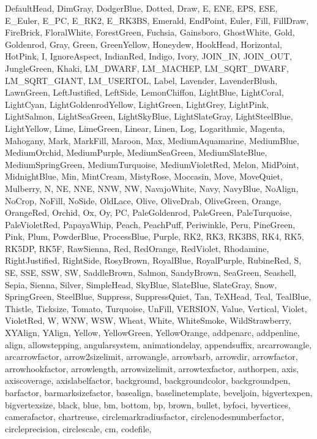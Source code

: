{{  DefaultHead, DimGray, DodgerBlue, Dotted, Draw, E, ENE, EPS, ESE, E_Euler,
  E_PC, E_RK2, E_RK3BS, Emerald, EndPoint, Euler, Fill, FillDraw, FireBrick,
  FloralWhite, ForestGreen, Fuchsia, Gainsboro, GhostWhite, Gold, Goldenrod,
  Gray, Green, GreenYellow, Honeydew, HookHead, Horizontal, HotPink, I,
  IgnoreAspect, IndianRed, Indigo, Ivory, JOIN_IN, JOIN_OUT, JungleGreen,
  Khaki, LM_DWARF, LM_MACHEP, LM_SQRT_DWARF, LM_SQRT_GIANT, LM_USERTOL,
  Label, Lavender, LavenderBlush, LawnGreen, LeftJustified, LeftSide,
  LemonChiffon, LightBlue, LightCoral, LightCyan, LightGoldenrodYellow,
  LightGreen, LightGrey, LightPink, LightSalmon, LightSeaGreen, LightSkyBlue,
  LightSlateGray, LightSteelBlue, LightYellow, Lime, LimeGreen, Linear,
  Linen, Log, Logarithmic, Magenta, Mahogany, Mark, MarkFill, Maroon, Max,
  MediumAquamarine, MediumBlue, MediumOrchid, MediumPurple, MediumSeaGreen,
  MediumSlateBlue, MediumSpringGreen, MediumTurquoise, MediumVioletRed,
  Melon, MidPoint, MidnightBlue, Min, MintCream, MistyRose, Moccasin, Move,
  MoveQuiet, Mulberry, N, NE, NNE, NNW, NW, NavajoWhite, Navy, NavyBlue,
  NoAlign, NoCrop, NoFill, NoSide, OldLace, Olive, OliveDrab, OliveGreen,
  Orange, OrangeRed, Orchid, Ox, Oy, PC, PaleGoldenrod, PaleGreen,
  PaleTurquoise, PaleVioletRed, PapayaWhip, Peach, PeachPuff, Periwinkle,
  Peru, PineGreen, Pink, Plum, PowderBlue, ProcessBlue, Purple, RK2, RK3,
  RK3BS, RK4, RK5, RK5DP, RK5F, RawSienna, Red, RedOrange, RedViolet,
  Rhodamine, RightJustified, RightSide, RosyBrown, RoyalBlue, RoyalPurple,
  RubineRed, S, SE, SSE, SSW, SW, SaddleBrown, Salmon, SandyBrown, SeaGreen,
  Seashell, Sepia, Sienna, Silver, SimpleHead, SkyBlue, SlateBlue, SlateGray,
  Snow, SpringGreen, SteelBlue, Suppress, SuppressQuiet, Tan, TeXHead, Teal,
  TealBlue, Thistle, Ticksize, Tomato, Turquoise, UnFill, VERSION, Value,
  Vertical, Violet, VioletRed, W, WNW, WSW, Wheat, White, WhiteSmoke,
  WildStrawberry, XYAlign, YAlign, Yellow, YellowGreen, YellowOrange,
  addpenarc, addpenline, align, allowstepping, angularsystem, animationdelay,
  appendsuffix, arcarrowangle, arcarrowfactor, arrow2sizelimit, arrowangle,
  arrowbarb, arrowdir, arrowfactor, arrowhookfactor, arrowlength,
  arrowsizelimit, arrowtexfactor, authorpen, axis, axiscoverage,
  axislabelfactor, background, backgroundcolor, backgroundpen, barfactor,
  barmarksizefactor, basealign, baselinetemplate, beveljoin, bigvertexpen,
  bigvertexsize, black, blue, bm, bottom, bp, brown, bullet, byfoci,
  byvertices, camerafactor, chartreuse, circlemarkradiusfactor,
  circlenodesnumberfactor, circleprecision, circlescale, cm, codefile,
}}
